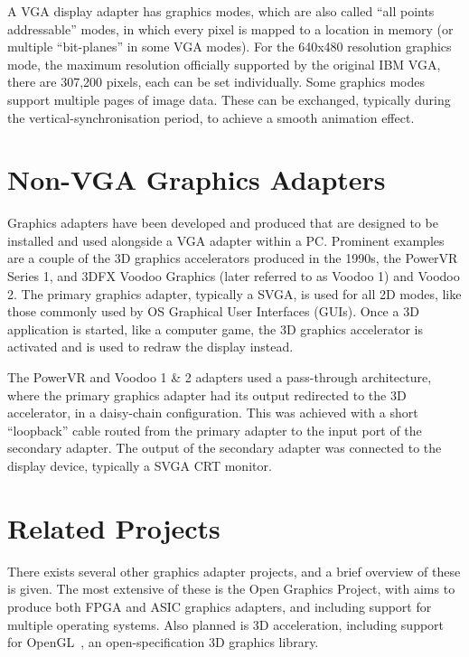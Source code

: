 A VGA display adapter has graphics modes, which are also called ``all points
addressable'' modes, in which every pixel is mapped to a location in memory (or
multiple ``bit-planes'' in some VGA modes). For the 640x480 resolution graphics
mode, the maximum resolution officially supported by the original IBM VGA, there
are 307,200 pixels, each can be set individually. Some graphics modes support
multiple pages of image data. These can be exchanged, typically during the
vertical-synchronisation period, to achieve a smooth animation effect.


\section{Non-VGA Graphics Adapters}
Graphics adapters have been developed and produced that are designed to be
installed and used alongside a VGA adapter within a PC. Prominent examples are a
couple of the 3D graphics accelerators produced in the 1990s, the PowerVR Series
1, and 3DFX Voodoo Graphics (later referred to as Voodoo 1) and Voodoo 2. The
primary graphics adapter, typically a SVGA, is used for all 2D modes, like those
commonly used by OS Graphical User Interfaces (GUIs). Once a 3D application is started,
like a computer game, the 3D graphics accelerator is activated and is used to
redraw the display instead.

The PowerVR and Voodoo 1 \& 2 adapters used a pass-through architecture, where
the primary graphics adapter had its output redirected to the 3D accelerator, in
a daisy-chain configuration. This was achieved with a short ``loopback'' cable
routed from the primary adapter to the input port of the secondary adapter. The
output of the secondary adapter was connected to the display device, typically a
SVGA CRT monitor.


\section{Related Projects}
There exists several other graphics adapter projects, and a brief overview of
these is given. The most extensive of these is the Open Graphics Project, with
aims to produce both FPGA and ASIC graphics adapters, and including support for
multiple operating systems. Also planned is 3D acceleration, including support
for OpenGL~\cite{OpenGL}, an open-specification 3D graphics library.


